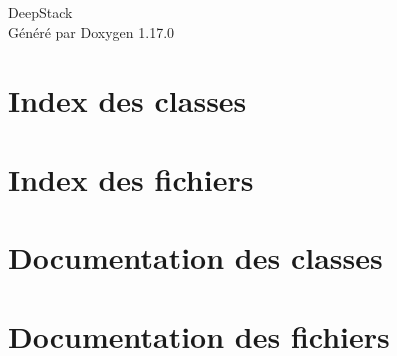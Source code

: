 \documentclass[twoside]{book}
\newcommand{\+}{\discretionary{\mbox{\scriptsize$\hookleftarrow$}}{}{}}
\newcommand{\clearemptydoublepage}{%
    \newpage{\pagestyle{empty}\cleardoublepage}%
  }
\begin{document}
  \raggedbottom
    \hypersetup{pageanchor=false,
                bookmarksnumbered=true,
                pdfencoding=unicode
               }
  \begin{titlepage}
  \vspace*{7cm}
  \begin{center}%
  {\Large Deep\+Stack}\\
  \vspace*{1cm}
  {\large Généré par Doxygen 1.17.0}\\
  \end{center}
  \end{titlepage}
  \clearemptydoublepage
  \tableofcontents
  \clearemptydoublepage
  \hypersetup{pageanchor=true}
\chapter{Index des classes}

\chapter{Index des fichiers}

\chapter{Documentation des classes}



\chapter{Documentation des fichiers}


















  \backmatter
  \newpage
  \clearemptydoublepage
  \printindex
\end{document}
